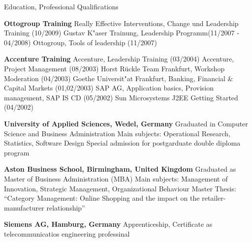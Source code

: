 \begin{rubric}{Education, Professional Qualifications}

\entry*[01/2005--10/2009] \textbf{Ottogroup Training}\newline
Really Effective Interventions, Change und Leadership Training (10/2009)
Gustav K"aser Trainung, Leadership Programm(11/2007 - 04/2008)
Ottogroup, Tools of leadership (11/2007)


\entry*[04/2002--12/2004] \textbf{Accenture Training}\newline
Accenture, Leadership Training (03/2004)
Accenture, Project Management (08/2003)
Horst R\"u{}ckle Team Frankfurt, Workshop Moderation (04/2003)
Goethe Universit"at Frankfurt, Banking, Financial \& Capital Markets (01,02/2003)
SAP AG, Application basics, Provision management, SAP IS CD (05/2002)
Sun Microsystems J2EE Getting Started (04/2002)

\entry*[04/1997--09/2001] \textbf{University of Applied Sciences, Wedel, Germany}\newline
Graduated in Computer Science and Business Administration \newline 
Main subjects: Operational Research, Statistics, Software Design \newline 
Special admission for postgarduate double diploma program

\entry*[10/1999--10/2000] \textbf{Aston Business School, Birmingham, United Kingdom}\newline
Graduated as Master of Business Administration (MBA)\newline 
Main subjects: Management of Innovation, Strategic Management, Organizational Behaviour \newline 
Master Thesis: ``Category Management: Online Shopping and the impact on the retailer-manufacturer relationship''

\entry*[08/1991--02/1995] \textbf{Siemens AG, Hamburg, Germany}\newline 
Apprenticeship, Certificate as telecommunicatios engineering professinal

\end{rubric}

